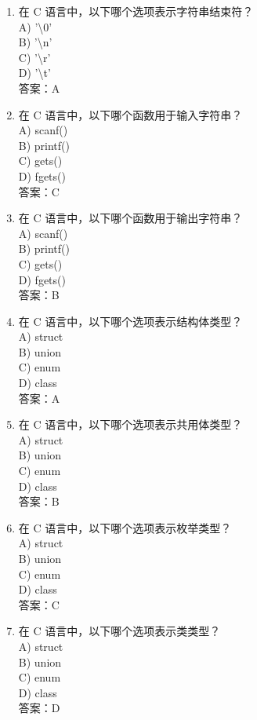 \documentclass[a4paper,12pt]{article}
\begin{document}
\begin{enumerate}
    \item 在 C 语言中，以下哪个选项表示字符串结束符？\\
    A) '\textbackslash 0' \\
    B) '\textbackslash n' \\
    C) '\textbackslash r' \\
    D) '\textbackslash t' \\
    答案：A

    \item 在 C 语言中，以下哪个函数用于输入字符串？\\
    A) scanf() \\
    B) printf() \\
    C) gets() \\
    D) fgets() \\
    答案：C

    \item 在 C 语言中，以下哪个函数用于输出字符串？\\
    A) scanf() \\
    B) printf() \\
    C) gets() \\
    D) fgets() \\
    答案：B

    \item 在 C 语言中，以下哪个选项表示结构体类型？\\
    A) struct \\
    B) union \\
    C) enum \\
    D) class \\
    答案：A

    \item 在 C 语言中，以下哪个选项表示共用体类型？\\
    A) struct \\
    B) union \\
    C) enum \\
    D) class \\
    答案：B

    \item 在 C 语言中，以下哪个选项表示枚举类型？\\
    A) struct \\
    B) union \\
    C) enum \\
    D) class \\
    答案：C

    \item 在 C 语言中，以下哪个选项表示类类型？\\
    A) struct \\
    B) union \\
    C) enum \\
    D) class \\
    答案：D


\end{enumerate}
\end{document}
